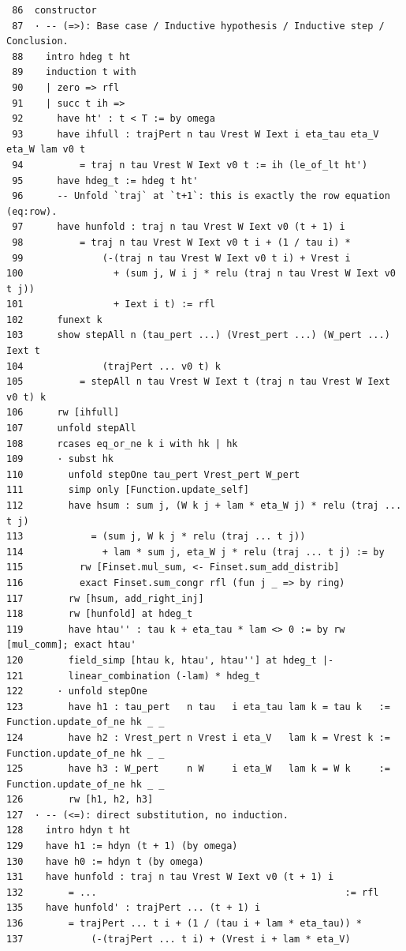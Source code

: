 \documentclass[11pt]{article}
\begin{document}
\begin{verbatim}
 86  constructor
 87  · -- (=>): Base case / Inductive hypothesis / Inductive step / Conclusion.
 88    intro hdeg t ht
 89    induction t with
 90    | zero => rfl
 91    | succ t ih =>
 92      have ht' : t < T := by omega
 93      have ihfull : trajPert n tau Vrest W Iext i eta_tau eta_V eta_W lam v0 t
 94          = traj n tau Vrest W Iext v0 t := ih (le_of_lt ht')
 95      have hdeg_t := hdeg t ht'
 96      -- Unfold `traj` at `t+1`: this is exactly the row equation (eq:row).
 97      have hunfold : traj n tau Vrest W Iext v0 (t + 1) i
 98          = traj n tau Vrest W Iext v0 t i + (1 / tau i) *
 99              (-(traj n tau Vrest W Iext v0 t i) + Vrest i
100                + (sum j, W i j * relu (traj n tau Vrest W Iext v0 t j))
101                + Iext i t) := rfl
102      funext k
103      show stepAll n (tau_pert ...) (Vrest_pert ...) (W_pert ...) Iext t
104              (trajPert ... v0 t) k
105          = stepAll n tau Vrest W Iext t (traj n tau Vrest W Iext v0 t) k
106      rw [ihfull]
107      unfold stepAll
108      rcases eq_or_ne k i with hk | hk
109      · subst hk
110        unfold stepOne tau_pert Vrest_pert W_pert
111        simp only [Function.update_self]
112        have hsum : sum j, (W k j + lam * eta_W j) * relu (traj ... t j)
113            = (sum j, W k j * relu (traj ... t j))
114              + lam * sum j, eta_W j * relu (traj ... t j) := by
115          rw [Finset.mul_sum, <- Finset.sum_add_distrib]
116          exact Finset.sum_congr rfl (fun j _ => by ring)
117        rw [hsum, add_right_inj]
118        rw [hunfold] at hdeg_t
119        have htau'' : tau k + eta_tau * lam <> 0 := by rw [mul_comm]; exact htau'
120        field_simp [htau k, htau', htau''] at hdeg_t |-
121        linear_combination (-lam) * hdeg_t
122      · unfold stepOne
123        have h1 : tau_pert   n tau   i eta_tau lam k = tau k   := Function.update_of_ne hk _ _
124        have h2 : Vrest_pert n Vrest i eta_V   lam k = Vrest k := Function.update_of_ne hk _ _
125        have h3 : W_pert     n W     i eta_W   lam k = W k     := Function.update_of_ne hk _ _
126        rw [h1, h2, h3]
127  · -- (<=): direct substitution, no induction.
128    intro hdyn t ht
129    have h1 := hdyn (t + 1) (by omega)
130    have h0 := hdyn t (by omega)
131    have hunfold : traj n tau Vrest W Iext v0 (t + 1) i
132        = ...                                            := rfl
135    have hunfold' : trajPert ... (t + 1) i
136        = trajPert ... t i + (1 / (tau i + lam * eta_tau)) *
137            (-(trajPert ... t i) + (Vrest i + lam * eta_V)

\end{verbatim}
\end{document}
